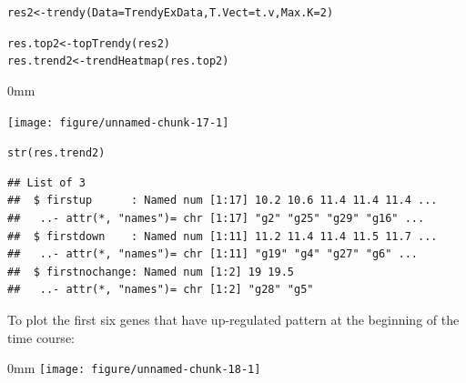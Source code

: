 \documentclass{article}\usepackage[]{graphicx}\usepackage[usenames,dvipsnames]{color}
\newcommand{\hlnum}[1]{\textcolor[rgb]{0.816,0.125,0.439}{#1}}%
\newcommand{\hlopt}[1]{\textcolor[rgb]{0,0,0}{#1}}%
\newcommand{\hlstd}[1]{\textcolor[rgb]{0.251,0.251,0.251}{#1}}%
\newcommand{\hlkwb}[1]{\textcolor[rgb]{0,0,0}{#1}}%
\newcommand{\hlkwc}[1]{\textcolor[rgb]{0.251,0.251,0.251}{#1}}%
\newcommand{\hlkwd}[1]{\textcolor[rgb]{0.878,0.439,0.125}{#1}}%
\newenvironment{knitrout}{}{} %
\begin{document}
\begin{knitrout}
\color{fgcolor}\begin{kframe}
\begin{alltt}
\hlstd{res2} \hlkwb{<-} \hlkwd{trendy}\hlstd{(}\hlkwc{Data} \hlstd{= TrendyExData,} \hlkwc{T.Vect}\hlstd{=t.v,} \hlkwc{Max.K}\hlstd{=}\hlnum{2}\hlstd{)}

\hlstd{res.top2} \hlkwb{<-} \hlkwd{topTrendy}\hlstd{(res2)}
\hlstd{res.trend2} \hlkwb{<-} \hlkwd{trendHeatmap}\hlstd{(res.top2)}
\end{alltt}
\end{kframe}\begin{adjustwidth}{\fltoffset}{0mm}

{\centering \texttt{[image: figure/unnamed-chunk-17-1]} 

}

\end{adjustwidth}\begin{kframe}\begin{alltt}
\hlkwd{str}\hlstd{(res.trend2)}
\end{alltt}
\begin{verbatim}
## List of 3
##  $ firstup      : Named num [1:17] 10.2 10.6 11.4 11.4 11.4 ...
##   ..- attr(*, "names")= chr [1:17] "g2" "g25" "g29" "g16" ...
##  $ firstdown    : Named num [1:11] 11.2 11.4 11.4 11.5 11.7 ...
##   ..- attr(*, "names")= chr [1:11] "g19" "g4" "g27" "g6" ...
##  $ firstnochange: Named num [1:2] 19 19.5
##   ..- attr(*, "names")= chr [1:2] "g28" "g5"
\end{verbatim}
\end{kframe}
\end{knitrout}

To plot the first six genes that have up-regulated pattern at the beginning of the time course:
\begin{knitrout}
\color{fgcolor}\begin{adjustwidth}{\fltoffset}{0mm}
\texttt{[image: figure/unnamed-chunk-18-1]} \end{adjustwidth}
\end{knitrout}
\end{document}

